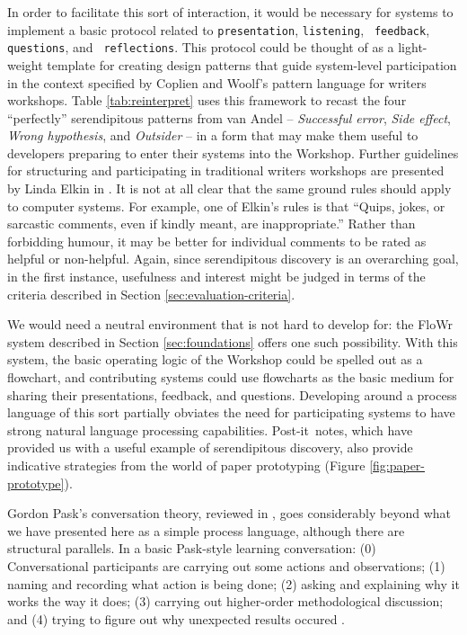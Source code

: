 \documentclass{article}
\begin{document}
In order to facilitate this sort of interaction, it would be necessary
for systems to implement a basic protocol related to
{\tt presentation}, {\tt listening}, {\tt
  feedback}, {\tt questions}, and {\tt
  reflections}.
This protocol could be thought of as a light-weight template for
creating design patterns that guide system-level participation in the
context specified by Coplien and Woolf's pattern language for writers
workshops.  Table \ref{tab:reinterpret} uses this framework to recast
the four ``perfectly'' serendipitous patterns from van Andel --
\emph{Successful error}, \emph{Side effect}, \emph{Wrong hypothesis},
and \emph{Outsider} -- in a form that may make them useful to
developers preparing to enter their systems into the Workshop.
%
Further guidelines for structuring and participating in traditional
writers workshops are presented by Linda Elkin in
\cite[pp. 201-203]{gabriel2002writer}.  It is not at all clear that
the same ground rules should apply to computer systems.  For example,
one of Elkin's rules is that ``Quips, jokes, or sarcastic comments,
even if kindly meant, are inappropriate.''  Rather than forbidding
humour, it may be better for individual comments to be rated as
helpful or non-helpful.  Again, since serendipitous discovery is an
overarching goal, in the first instance, usefulness and interest might
be judged in terms of the criteria described in Section
\ref{sec:evaluation-criteria}.

We would need a neutral environment that is not hard to develop for:
the {\sf FloWr} system described in Section \ref{sec:foundations}
offers one such possibility.  With this system, the basic operating
logic of the Workshop could be spelled out as a flowchart, and
contributing systems could use flowcharts as the basic medium for
sharing their presentations, feedback, and questions.  Developing
around a process language of this sort partially obviates the need for
participating systems to have strong natural language processing
capabilities.  
%
Post-it\texttrademark\ notes, which have provided us with a useful
example of serendipitous discovery, also provide indicative strategies
from the world of paper prototyping (Figure \ref{fig:paper-prototype}).

Gordon Pask's conversation theory, reviewed in
\cite{conversation-theory-review,boyd2004conversation}, goes
considerably beyond what we have presented here as a simple process
language, although there are structural parallels.  In a basic
Pask-style learning conversation: (0) Conversational participants are
carrying out some actions and observations; (1) naming and recording
what action is being done; (2) asking and explaining why it works the
way it does; (3) carrying out higher-order methodological discussion;
and (4) trying to figure out why unexpected results occured \cite[p. 190]{boyd2004conversation}.
\end{document}
